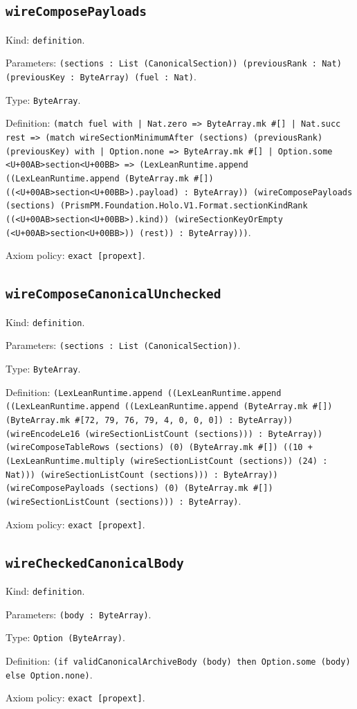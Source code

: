 \documentclass[11pt]{article}
\begin{document}
\subsection*{\texttt{wireComposePayloads}}
\noindent Kind: \texttt{definition}.\par
\noindent Parameters: \texttt{(sections : List (CanonicalSection)) (previousRank : Nat) (previousKey : ByteArray) (fuel : Nat)}.\par
\noindent Type: \texttt{ByteArray}.\par
\noindent Definition: \texttt{(match fuel with | Nat.zero => ByteArray.mk \#[] | Nat.succ rest => (match wireSectionMinimumAfter (sections) (previousRank) (previousKey) with | Option.none => ByteArray.mk \#[] | Option.some <U+00AB>section<U+00BB> => (LexLeanRuntime.append ((LexLeanRuntime.append (ByteArray.mk \#[]) ((<U+00AB>section<U+00BB>).payload) : ByteArray)) (wireComposePayloads (sections) (PrismPM.Foundation.Holo.V1.Format.sectionKindRank ((<U+00AB>section<U+00BB>).kind)) (wireSectionKeyOrEmpty (<U+00AB>section<U+00BB>)) (rest)) : ByteArray)))}.\par
\noindent Axiom policy: \texttt{exact [propext]}.\par
\subsection*{\texttt{wireComposeCanonicalUnchecked}}
\noindent Kind: \texttt{definition}.\par
\noindent Parameters: \texttt{(sections : List (CanonicalSection))}.\par
\noindent Type: \texttt{ByteArray}.\par
\noindent Definition: \texttt{(LexLeanRuntime.append ((LexLeanRuntime.append ((LexLeanRuntime.append ((LexLeanRuntime.append (ByteArray.mk \#[]) (ByteArray.mk \#[72, 79, 76, 79, 4, 0, 0, 0]) : ByteArray)) (wireEncodeLe16 (wireSectionListCount (sections))) : ByteArray)) (wireComposeTableRows (sections) (0) (ByteArray.mk \#[]) ((10 + (LexLeanRuntime.multiply (wireSectionListCount (sections)) (24) : Nat))) (wireSectionListCount (sections))) : ByteArray)) (wireComposePayloads (sections) (0) (ByteArray.mk \#[]) (wireSectionListCount (sections))) : ByteArray)}.\par
\noindent Axiom policy: \texttt{exact [propext]}.\par
\subsection*{\texttt{wireCheckedCanonicalBody}}
\noindent Kind: \texttt{definition}.\par
\noindent Parameters: \texttt{(body : ByteArray)}.\par
\noindent Type: \texttt{Option (ByteArray)}.\par
\noindent Definition: \texttt{(if validCanonicalArchiveBody (body) then Option.some (body) else Option.none)}.\par
\noindent Axiom policy: \texttt{exact [propext]}.\par
\end{document}
